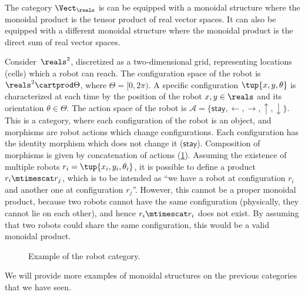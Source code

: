 

\begin{example}
    \label{ex:Vect-symmetric-monoidal}
    The category $\Vect_\reals$ is can be equipped with a monoidal structure where the monoidal product is the tensor product of real vector spaces.
    It can also be equipped with a different monoidal structure where the monoidal product is the direct sum of real vector spaces.
\end{example}

\begin{example}
    \label{ex:robot}
    Consider~$\reals^2$, discretized as a two-dim\-ensional grid, representing locations (cells) which a robot can reach.
    The configuration space of the robot is $\reals^2\cartprod \Theta$, where $\Theta=[0,2\pi)$.
    A specific configuration $\tup{x,y,\theta}$ is characterized at each time by the position of the robot $x,y\in \reals$ and its orientation $\theta \in \Theta$.
    The action space of the robot is $\mathcal{A}=\{\mathsf{stay},\leftarrow, \rightarrow, \uparrow, \downarrow\}$.
    This is a category, where each configuration of the robot is an object, and morphisms are robot actions which change configurations.
    Each configuration has the identity morphism which does not change it ($\mathsf{stay}$).
    Composition of morphisms is given by concatenation of actions (\cref{fig:robotcategory}).
    Assuming the existence of multiple robots $r_i=\tup{x_i,y_i,\theta_i}$, it is possible to define a product $r_i\mtimescat r_j$, which is to be intended as ``we have a robot at configuration $r_i$ and another one at configuration $r_j$''.
    However, this cannot be a proper monoidal product, because two robots cannot have the same configuration (physically, they cannot lie on each other), and hence $r_i\mtimescat r_i$ does not exist.
    By assuming that two robots could share the same configuration, this would be a valid monoidal product.
    \begin{figure}[tbh]
        \centering
        \caption{Example of the robot category. }
        \label{fig:robotcategory}
    \end{figure}
\end{example}

\begin{publictodo}
    We will provide more examples of monoidal structures on the previous categories that we have seen.
\end{publictodo}

